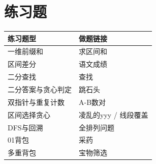 \section{练习题}
\begin{longtable}{P{5cm}P{9cm}}
\toprule 练习题型 & 做题链接\\\midrule
一维前缀和 &  求区间和\\
区间差分 &  语文成绩\\
二分查找 &  查找\\
二分答案与贪心判定 &  跳石头\\
双指针与重复计数 &  A-B数对\\
区间选择贪心 &  凌乱的yyy / 线段覆盖\\
DFS与回溯 &  全排列问题\\
01背包 &  采药\\
多重背包 &  宝物筛选\\
\bottomrule\end{longtable}
